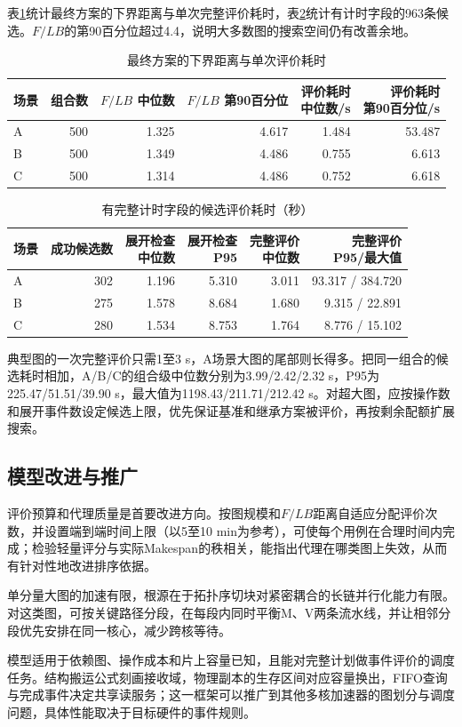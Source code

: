 表\ref{tab:eval-cost}统计最终方案的下界距离与单次完整评价耗时，表\ref{tab:algorithm-timing}统计有计时字段的963条候选。$F/LB$的第90百分位超过4.4，说明大多数图的搜索空间仍有改善余地。
\begin{table}[H]\centering\small
\caption{最终方案的下界距离与单次评价耗时}\label{tab:eval-cost}
\setlength{\tabcolsep}{4pt}
\begin{tabular}{lrrrrr}\toprule
场景 & 组合数 & \shortstack{$F/LB$\\中位数} & \shortstack{$F/LB$\\第90百分位} & \shortstack{评价耗时\\中位数/s} & \shortstack{评价耗时\\第90百分位/s}\\\midrule
A & 500 & 1.325 & 4.617 & 1.484 & 53.487\\
B & 500 & 1.349 & 4.486 & 0.755 & 6.613\\
C & 500 & 1.314 & 4.486 & 0.752 & 6.618\\\bottomrule
\end{tabular}\end{table}
\begin{table}[H]\centering\small
\caption{有完整计时字段的候选评价耗时（秒）}
\label{tab:algorithm-timing}
\setlength{\tabcolsep}{2.4pt}
\begin{tabular}{lrrrrr}\toprule
场景 & 成功候选数 & \shortstack{展开检查\\中位数} & \shortstack{展开检查\\P95} & \shortstack{完整评价\\中位数} & \shortstack{完整评价\\P95/最大值}\\\midrule
A & 302 & 1.196 & 5.310 & 3.011 & 93.317 / 384.720\\
B & 275 & 1.578 & 8.684 & 1.680 & 9.315 / 22.891\\
C & 280 & 1.534 & 8.753 & 1.764 & 8.776 / 15.102\\\bottomrule
\end{tabular}
\end{table}
典型图的一次完整评价只需1至3 s，A场景大图的尾部则长得多。把同一组合的候选耗时相加，A/B/C的组合级中位数分别为3.99/2.42/2.32 s，P95为225.47/51.51/39.90 s，最大值为1198.43/211.71/212.42 s。对超大图，应按操作数和展开事件数设定候选上限，优先保证基准和继承方案被评价，再按剩余配额扩展搜索。

\subsection{模型改进与推广}
评价预算和代理质量是首要改进方向。按图规模和$F/LB$距离自适应分配评价次数，并设置端到端时间上限（以5至10 min为参考），可使每个用例在合理时间内完成；检验轻量评分与实际Makespan的秩相关，能指出代理在哪类图上失效，从而有针对性地改进排序依据。

单分量大图的加速有限，根源在于拓扑序切块对紧密耦合的长链并行化能力有限。对这类图，可按关键路径分段，在每段内同时平衡M、V两条流水线，并让相邻分段优先安排在同一核心，减少跨核等待。

模型适用于依赖图、操作成本和片上容量已知，且能对完整计划做事件评价的调度任务。结构搬运公式刻画接收域，物理副本的生存区间对应容量换出，FIFO查询与完成事件决定共享读服务；这一框架可以推广到其他多核加速器的图划分与调度问题，具体性能取决于目标硬件的事件规则。
